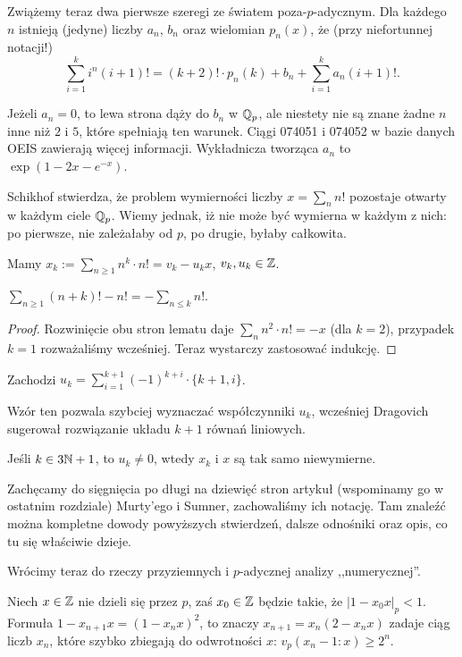 Zwiążemy  teraz dwa pierwsze szeregi ze światem poza-$p$-adycznym.
Dla każdego $n$ istnieją (jedyne) liczby $a_n$, $b_n$ oraz wielomian $p_n(x)$, że (przy niefortunnej notacji!)
\[
	\sum_{i = 1}^k i^n (i+1)! = (k+2)! \cdot p_n(k) + b_n + \sum_{i = 1}^k a_n (i+1)!.
\]

Jeżeli $a_n = 0$, to lewa strona dąży do $b_n$ w $\mathbb Q_p$, ale niestety nie są znane żadne $n$ inne niż $2$ i $5$, które spełniają ten warunek.
Ciągi 074051 i 074052 w bazie danych OEIS zawierają więcej informacji.
Wykładnicza tworząca $a_n$ to $\exp(1-2x-e^{-x})$.

Schikhof stwierdza, że problem  wymierności liczby $x = \sum_n n!$ pozostaje otwarty w każdym ciele $\mathbb Q_p$.
Wiemy jednak, iż nie może być wymierna w każdym z nich: po pierwsze, nie zależałaby od $p$, po drugie, byłaby całkowita.

\begin{fakt}
	Mamy  $x_k := \sum_{n \ge 1} n^k \cdot n! = v_k - u_k x$, $v_k, u_k \in \mathbb Z$.
\end{fakt}

\begin{lemat}
	$\sum_{n \ge 1} (n+k)! - n! = - \sum_{n\le k} n!$.
\end{lemat}

\begin{proof}
Rozwinięcie obu stron lematu daje $\sum_n n^2 \cdot n! = -x$ (dla $k = 2$), przypadek $k = 1$ rozważaliśmy wcześniej.
Teraz wystarczy zastosować indukcję.
\end{proof}

\begin{fakt}
	Zachodzi $u_k = \sum_{i=1}^{k+1} (-1)^{k+i} \cdot \{k+1, i\}$.
\end{fakt}

Wzór ten pozwala szybciej wyznaczać współczynniki $u_k$, wcześniej Dragovich sugerował rozwiązanie układu $k+1$ równań liniowych.

\begin{fakt}
	Jeśli $k \in 3\mathbb N + 1$, to $u_k \neq 0$, wtedy $x_k$ i $x$ są tak samo niewymierne.
\end{fakt}

Zachęcamy do sięgnięcia po długi na dziewięć stron artykuł (wspominamy go w ostatnim rozdziale) Murty'ego i Sumner, zachowaliśmy ich notację.
Tam znaleźć można kompletne dowody powyższych stwierdzeń, dalsze odnośniki oraz opis, co tu się właściwie dzieje.

Wrócimy teraz do rzeczy przyziemnych i $p$-adycznej analizy ,,numerycznej''.

\begin{fakt}
	Niech  $x \in \mathbb Z$ nie dzieli się przez $p$, zaś $x_0 \in \mathbb Z$ będzie takie, że $|1 - x_0x|_p < 1$.
	Formuła $1 - x_{n+1} x = (1 - x_n x)^2$, to znaczy $x_{n+1} = x_n (2 - x_nx)$ zadaje ciąg liczb $x_n$, które szybko zbiegają do odwrotności $x$: $v_p(x_n - 1 : x) \ge 2^n$.
\end{fakt}